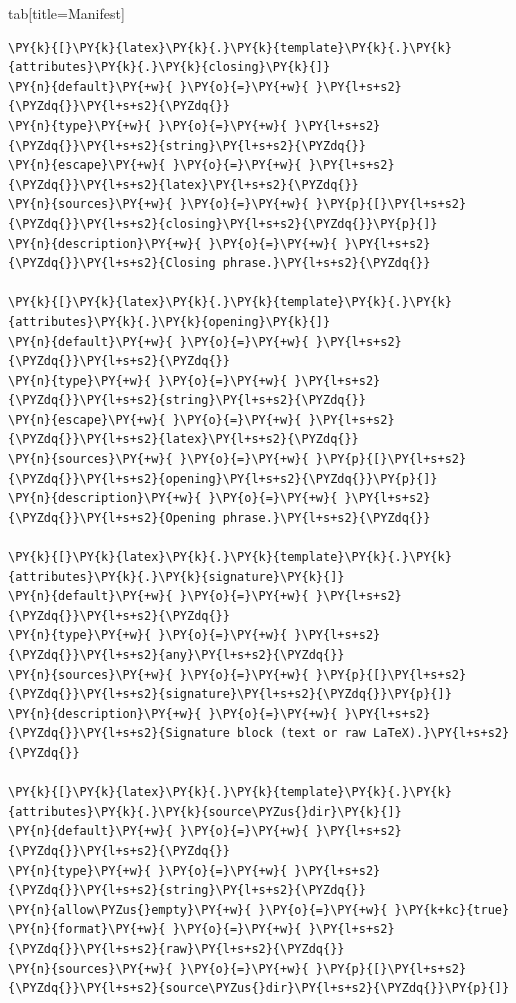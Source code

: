 \documentclass[a4paper,twoside]{article}
\begin{document}
\begin{tsdiv}{tab}[title=Manifest]
\begin{tscode}[lang=toml, engine=pygments]
\begin{Verbatim}[commandchars=\\\{\},breaklines, breakanywhere, commandchars=\\\{\}]
\PY{k}{[}\PY{k}{latex}\PY{k}{.}\PY{k}{template}\PY{k}{.}\PY{k}{attributes}\PY{k}{.}\PY{k}{closing}\PY{k}{]}
\PY{n}{default}\PY{+w}{ }\PY{o}{=}\PY{+w}{ }\PY{l+s+s2}{\PYZdq{}}\PY{l+s+s2}{\PYZdq{}}
\PY{n}{type}\PY{+w}{ }\PY{o}{=}\PY{+w}{ }\PY{l+s+s2}{\PYZdq{}}\PY{l+s+s2}{string}\PY{l+s+s2}{\PYZdq{}}
\PY{n}{escape}\PY{+w}{ }\PY{o}{=}\PY{+w}{ }\PY{l+s+s2}{\PYZdq{}}\PY{l+s+s2}{latex}\PY{l+s+s2}{\PYZdq{}}
\PY{n}{sources}\PY{+w}{ }\PY{o}{=}\PY{+w}{ }\PY{p}{[}\PY{l+s+s2}{\PYZdq{}}\PY{l+s+s2}{closing}\PY{l+s+s2}{\PYZdq{}}\PY{p}{]}
\PY{n}{description}\PY{+w}{ }\PY{o}{=}\PY{+w}{ }\PY{l+s+s2}{\PYZdq{}}\PY{l+s+s2}{Closing phrase.}\PY{l+s+s2}{\PYZdq{}}

\PY{k}{[}\PY{k}{latex}\PY{k}{.}\PY{k}{template}\PY{k}{.}\PY{k}{attributes}\PY{k}{.}\PY{k}{opening}\PY{k}{]}
\PY{n}{default}\PY{+w}{ }\PY{o}{=}\PY{+w}{ }\PY{l+s+s2}{\PYZdq{}}\PY{l+s+s2}{\PYZdq{}}
\PY{n}{type}\PY{+w}{ }\PY{o}{=}\PY{+w}{ }\PY{l+s+s2}{\PYZdq{}}\PY{l+s+s2}{string}\PY{l+s+s2}{\PYZdq{}}
\PY{n}{escape}\PY{+w}{ }\PY{o}{=}\PY{+w}{ }\PY{l+s+s2}{\PYZdq{}}\PY{l+s+s2}{latex}\PY{l+s+s2}{\PYZdq{}}
\PY{n}{sources}\PY{+w}{ }\PY{o}{=}\PY{+w}{ }\PY{p}{[}\PY{l+s+s2}{\PYZdq{}}\PY{l+s+s2}{opening}\PY{l+s+s2}{\PYZdq{}}\PY{p}{]}
\PY{n}{description}\PY{+w}{ }\PY{o}{=}\PY{+w}{ }\PY{l+s+s2}{\PYZdq{}}\PY{l+s+s2}{Opening phrase.}\PY{l+s+s2}{\PYZdq{}}

\PY{k}{[}\PY{k}{latex}\PY{k}{.}\PY{k}{template}\PY{k}{.}\PY{k}{attributes}\PY{k}{.}\PY{k}{signature}\PY{k}{]}
\PY{n}{default}\PY{+w}{ }\PY{o}{=}\PY{+w}{ }\PY{l+s+s2}{\PYZdq{}}\PY{l+s+s2}{\PYZdq{}}
\PY{n}{type}\PY{+w}{ }\PY{o}{=}\PY{+w}{ }\PY{l+s+s2}{\PYZdq{}}\PY{l+s+s2}{any}\PY{l+s+s2}{\PYZdq{}}
\PY{n}{sources}\PY{+w}{ }\PY{o}{=}\PY{+w}{ }\PY{p}{[}\PY{l+s+s2}{\PYZdq{}}\PY{l+s+s2}{signature}\PY{l+s+s2}{\PYZdq{}}\PY{p}{]}
\PY{n}{description}\PY{+w}{ }\PY{o}{=}\PY{+w}{ }\PY{l+s+s2}{\PYZdq{}}\PY{l+s+s2}{Signature block (text or raw LaTeX).}\PY{l+s+s2}{\PYZdq{}}

\PY{k}{[}\PY{k}{latex}\PY{k}{.}\PY{k}{template}\PY{k}{.}\PY{k}{attributes}\PY{k}{.}\PY{k}{source\PYZus{}dir}\PY{k}{]}
\PY{n}{default}\PY{+w}{ }\PY{o}{=}\PY{+w}{ }\PY{l+s+s2}{\PYZdq{}}\PY{l+s+s2}{\PYZdq{}}
\PY{n}{type}\PY{+w}{ }\PY{o}{=}\PY{+w}{ }\PY{l+s+s2}{\PYZdq{}}\PY{l+s+s2}{string}\PY{l+s+s2}{\PYZdq{}}
\PY{n}{allow\PYZus{}empty}\PY{+w}{ }\PY{o}{=}\PY{+w}{ }\PY{k+kc}{true}
\PY{n}{format}\PY{+w}{ }\PY{o}{=}\PY{+w}{ }\PY{l+s+s2}{\PYZdq{}}\PY{l+s+s2}{raw}\PY{l+s+s2}{\PYZdq{}}
\PY{n}{sources}\PY{+w}{ }\PY{o}{=}\PY{+w}{ }\PY{p}{[}\PY{l+s+s2}{\PYZdq{}}\PY{l+s+s2}{source\PYZus{}dir}\PY{l+s+s2}{\PYZdq{}}\PY{p}{]}


\end{Verbatim}
\end{tscode}
\end{tsdiv}
\end{document}
